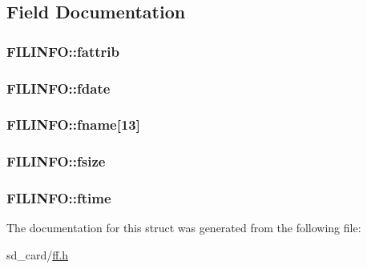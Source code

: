 \subsection{Field Documentation}
\hypertarget{structFILINFO_a838d542585831b085537b363f18205c0}{
\subsubsection[{fattrib}]{ F\-I\-L\-I\-N\-F\-O\-::fattrib}}\label{structFILINFO_a838d542585831b085537b363f18205c0}
\hypertarget{structFILINFO_a7c01c48a15b1b49da459924437b0bd52}{
\subsubsection[{fdate}]{ F\-I\-L\-I\-N\-F\-O\-::fdate}}\label{structFILINFO_a7c01c48a15b1b49da459924437b0bd52}
\hypertarget{structFILINFO_abd852510f2f79b4ec773156d8942dc7c}{
\subsubsection[{fname}]{ F\-I\-L\-I\-N\-F\-O\-::fname\mbox{[}13\mbox{]}}}\label{structFILINFO_abd852510f2f79b4ec773156d8942dc7c}
\hypertarget{structFILINFO_aee7441af7dc0c443d1e1e6011cc7dcac}{
\subsubsection[{fsize}]{ F\-I\-L\-I\-N\-F\-O\-::fsize}}\label{structFILINFO_aee7441af7dc0c443d1e1e6011cc7dcac}
\hypertarget{structFILINFO_ae0f751b79621bf7b29669f177bbe6b9a}{
\subsubsection[{ftime}]{ F\-I\-L\-I\-N\-F\-O\-::ftime}}\label{structFILINFO_ae0f751b79621bf7b29669f177bbe6b9a}


The documentation for this struct was generated from the following file\-:\begin{DoxyCompactItemize}
\item 
sd\-\_\-card/\hyperlink{ff_8h}{ff.\-h}\end{DoxyCompactItemize}
